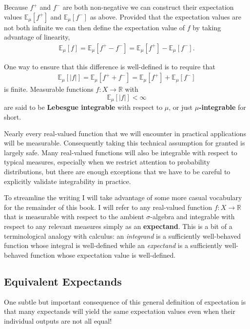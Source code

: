 \documentclass[
  letterpaper,
  DIV=11,
  numbers=noendperiod]{scrartcl}
\begin{document}
Because \(f^{+}\) and \(f^{-}\) are both non-negative we can construct
their expectation values \(\mathbb{E}_{\mu}[f^{+}]\) and
\(\mathbb{E}_{\mu}[f^{-}]\) as above. Provided that the expectation
values are not both infinite we can then define the expectation value of
\(f\) by taking advantage of linearity, \begin{align*}
\mathbb{E}_{\mu}[f]
=
\mathbb{E}_{\mu}[f^{+} - f^{-}]
=
\mathbb{E}_{\mu}[f^{+}] - \mathbb{E}_{\mu}[f^{-}].
\end{align*}

One way to ensure that this difference is well-defined is to require
that \begin{align*}
\mathbb{E}_{\mu}[| f |]
=
\mathbb{E}_{\mu}[f^{+} + f^{-}]
=
\mathbb{E}_{\mu}[f^{+}] + \mathbb{E}_{\mu}[f^{-}]
\end{align*} is finite. Measurable functions
\(f : X \rightarrow \mathbb{R}\) with \[
\mathbb{E}_{\mu}[| f |] < \infty
\] are said to be \textbf{Lebesgue integrable} with respect to \(\mu\),
or just \textbf{\(\mu\)-integrable} for short.

Nearly every real-valued function that we will encounter in practical
applications will be measurable. Consequently taking this technical
assumption for granted is largely safe. Many real-valued functions will
also be integrable with respect to typical measures, especially when we
restrict attention to probability distributions, but there are enough
exceptions that we have to be careful to explicitly validate
integrability in practice.

To streamline the writing I will take advantage of some more casual
vocabulary for the remainder of this book. I will refer to any
real-valued function \(f: X \rightarrow \mathbb{R}\) that is measurable
with respect to the ambient \(\sigma\)-algebra and integrable with
respect to any relevant measures simply as an \textbf{expectand}. This
is a bit of a terminological analogy with calculus: an \emph{integrand}
is a sufficiently well-behaved function whose integral is well-defined
while an \emph{expectand} is a sufficiently well-behaved function whose
expectation value is well-defined.

\hypertarget{equivalent-expectands}{%
\subsection{Equivalent Expectands}\label{equivalent-expectands}}

One subtle but important consequence of this general definition of
expectation is that many expectands will yield the same expectation
values even when their individual outputs are not all equal!
\end{document}

